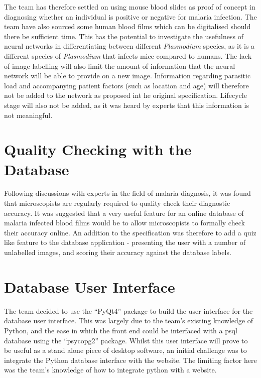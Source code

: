 \documentclass[a4paper,11pt]{article}
\begin{document}
The team has therefore settled on using mouse blood slides as proof of
concept in diagnosing whether an individual is positive or negative
for malaria infection. The team have also sourced some human blood
films which can be digitalised should there be sufficient time. This
has the potential to investigate the usefulness of neural networks in
differentiating between different \emph{Plasmodium} species, as it is
a different species of \emph{Plasmodium} that infects mice compared to
humans. The lack of image labelling will also limit the amount of
information that the neural network will be able to provide on a new
image. Information regarding parasitic load and accompanying patient
factors (such as location and age) will therefore not be added to the
network as proposed int he original specification. Lifecycle stage
will also not be added, as it was heard by experts that this
information is not meaningful.

\section{Quality Checking with the Database}
Following discussions with experts in the field of malaria diagnosis,
it was found that microscopists are regularly required to quality check their
diagnostic accuracy. It was suggested that a very useful feature for
an online database of malaria infected blood films would be to allow
microscopists to formally check their accuracy online. An addition to
the specification was therefore to add a quiz like feature to the
database application - presenting the user with a number of unlabelled
images, and scoring their accuracy against the database labels.

\section{Database User Interface}
The team decided to use the ``PyQt4'' package to build the user interface
for the database user interface. This was largely due to the team's
existing knowledge of Python, and the ease in which the front end
could be interfaced with a psql database using the ``psycopg2''
package. Whilst this user interface will prove to be useful as a stand
alone piece of desktop software, an initial challenge was to integrate the
Python database interface with the website. The limiting factor here
was the team's knowledge of how to integrate python with a website. %
\end{document}
